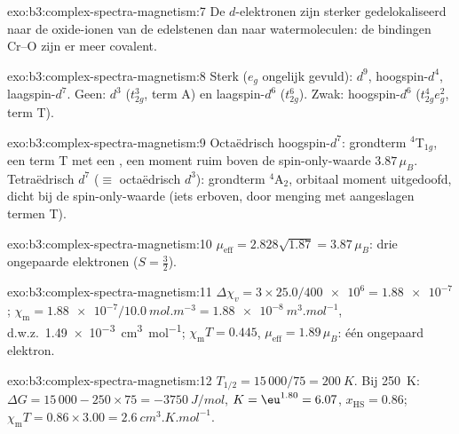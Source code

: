\begin{solution}{exo:b3:complex-spectra-magnetism:7}
De $d$-elektronen zijn sterker gedelokaliseerd naar de oxide-ionen van de
edelstenen dan naar watermoleculen: de bindingen Cr--O zijn er meer
covalent.
\end{solution}

\begin{solution}{exo:b3:complex-spectra-magnetism:8}
Sterk ($e_g$ ongelijk gevuld): $d^9$, hoogspin-$d^4$, laagspin-$d^7$. Geen: $d^3$ ($t_{2g}^3$, term A) en
laagspin-$d^6$ ($t_{2g}^6$). Zwak: hoogspin-$d^6$ ($t_{2g}^4e_g^2$, term T).
\end{solution}

\begin{solution}{exo:b3:complex-spectra-magnetism:9}
Octaëdrisch hoogspin-$d^7$: grondterm $^4$T$_{1g}$, een term T met een ,
een moment ruim boven de spin-only-waarde $3.87\,\mu_B$. Tetraëdrisch $d^7$ ($\equiv$ octaëdrisch $d^3$):
grondterm $^4$A$_2$, orbitaal moment uitgedoofd, dicht bij de spin-only-waarde
(iets erboven, door menging met aangeslagen termen T).
\end{solution}

\begin{solution}{exo:b3:complex-spectra-magnetism:10}
$\mu_{\mathrm{eff}} = 2.828\sqrt{1.87} = 3.87\,\mu_B$: drie ongepaarde elektronen ($S = \frac32$).
\end{solution}

\begin{solution}{exo:b3:complex-spectra-magnetism:11}
$\Delta\chi_v = 3 \times 25.0/\num{400e6} = \num{1.88e-7}$; $\chi_{\mathrm m} = \num{1.88e-7}/\qty{10.0}{mol.m^{-3}} = \qty{1.88e-8}{m^3.mol^{-1}}$, d.w.z.\
\qty{1.49e-3}{cm^3.mol^{-1}}; $\chi_{\mathrm m}T = 0.445$, $\mu_{\mathrm{eff}} = 1.89\,\mu_B$: één ongepaard elektron.
\end{solution}

\begin{solution}{exo:b3:complex-spectra-magnetism:12}
$T_{1/2} = 15\,000/75 = \qty{200}{K}$. Bij \qty{250}{K}: $\Delta G = 15\,000 - 250 \times 75 = \qty{-3750}{J/mol}$, $K = \eu^{1.80} = 6.07$,
$x_{\mathrm{HS}} = 0.86$; $\chi_{\mathrm m}T = 0.86 \times 3.00 = \qty{2.6}{cm^3.K.mol^{-1}}$.
\end{solution}

